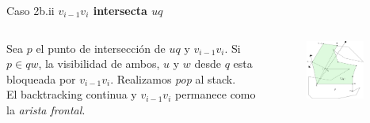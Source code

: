 \documentclass[aspectratio=169,xcolor=dvipsnames, t]{beamer}
\begin{document}
\begin{frame}{Caso 2b.ii}
    \textbf{$v_{i-1}v_{i}$ intersecta $uq$}\\
    \vspace{0.5cm}
    \begin{columns}
    \begin{column}{0.45\textwidth}
        Sea $p$ el punto de intersección de $uq$ y $v_{i-1}v_{i}$. Si $p \in qw$, la visibilidad de ambos, $u$ y $w$ desde $q$ esta bloqueada por $v_{i-1}v_{i}$. Realizamos \textit{pop} al stack.\\
        \vspace{0.5cm}
        El backtracking continua y $v_{i-1}v_{i}$ permanece como la \textit{arista frontal}.\\
    \vspace{0.5cm}
    \end{column}
    \begin{column}{0.45\textwidth}  %
    \vspace{-3cm}
        \begin{figure}
            \centering
            \includegraphics[width=0.85\textwidth]{imagenes/Caso2.7a.png}
        \end{figure}
    \end{column}
    \end{columns}
\end{frame}

\end{document}
